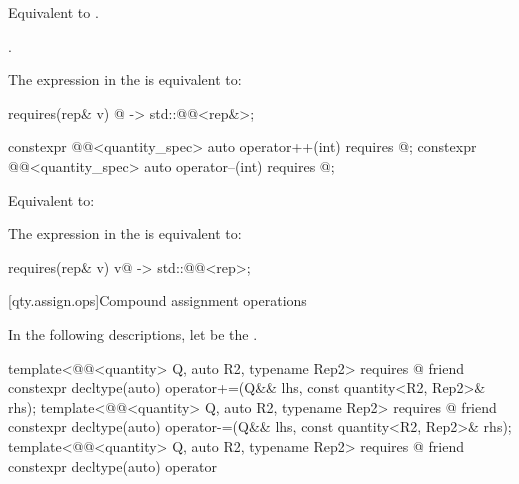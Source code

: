 \begin{itemdescr}
\pnum
\effects
Equivalent to
.

\pnum
\returns
{}.

\pnum
\remarks
The expression in the  is equivalent to:
\begin{codeblock}
requires(rep& v) {
  { @\atsign@v } -> std::@@<rep&>;
}
\end{codeblock}
\end{itemdescr}

\begin{itemdecl}
constexpr @@<quantity_spec> auto operator++(int)
  requires @\seebelownc@;
constexpr @@<quantity_spec> auto operator--(int)
  requires @\seebelownc@;
\end{itemdecl}

\begin{itemdescr}
\pnum
\effects
Equivalent to:

\pnum
\remarks
The expression in the  is equivalent to:
\begin{codeblock}
requires(rep& v) {
  { v@\atsign@ } -> std::@@<rep>;
}
\end{codeblock}
\end{itemdescr}

[qty.assign.ops]{Compound assignment operations}

\pnum
In the following descriptions,
let  be the .

\begin{itemdecl}
template<@@<quantity> Q, auto R2, typename Rep2>
  requires @\seebelownc@
friend constexpr decltype(auto) operator+=(Q&& lhs, const quantity<R2, Rep2>& rhs);
template<@@<quantity> Q, auto R2, typename Rep2>
  requires @\seebelownc@
friend constexpr decltype(auto) operator-=(Q&& lhs, const quantity<R2, Rep2>& rhs);
template<@@<quantity> Q, auto R2, typename Rep2>
  requires @\seebelownc@
friend constexpr decltype(auto) operator%
\end{itemdecl}

